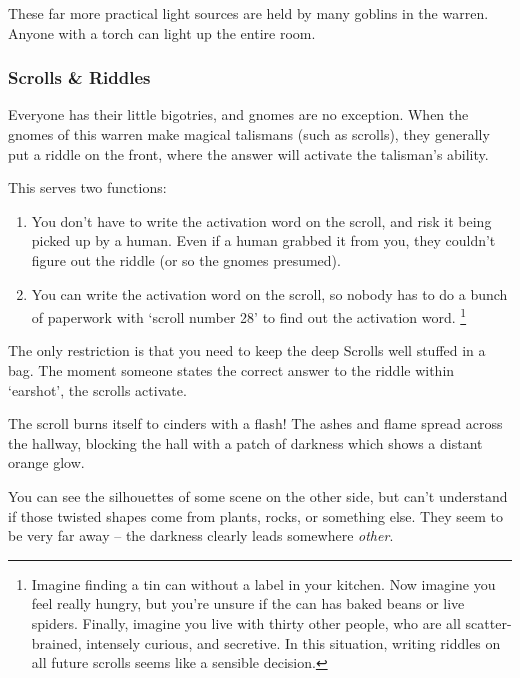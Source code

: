 \begin{multicols}{2}
These far more practical light sources are held by many goblins in the \gls{warren}.
Anyone with a torch can light up the entire room.

\subsubsection{Scrolls \& Riddles}
\label{scrollRiddles}

Everyone has their little bigotries, and gnomes are no exception.
When the gnomes of this \gls{warren} make magical \glspl{talisman} (such as scrolls), they generally put a riddle on the front, where the answer will activate the \gls{talisman}'s ability.

This serves two functions:

\begin{enumerate}
  \item
  You don't have to write the activation word on the scroll, and risk it being picked up by a human.
  Even if a human grabbed it from you, they couldn't figure out the riddle (or so the gnomes presumed).
  \item
  You can write the activation word on the scroll, so nobody has to do a bunch of paperwork with `scroll number 28' to find out the activation word.%
  \footnote{Imagine finding a tin can without a label in your kitchen.
  Now imagine you feel really hungry, but you're unsure if the can has baked beans or live spiders.
  Finally, imagine you live with thirty other people, who are all scatter-brained, intensely curious, and secretive.
  In this situation, writing riddles on all future scrolls seems like a sensible decision.}
\end{enumerate}

The only restriction is that you need to keep the \Gls{deep} Scrolls well stuffed in a bag.
The moment someone states the correct answer to the riddle within `earshot', the scrolls activate.

\labyrinthScroll

\showTalisman

\begin{boxtext}
  The scroll burns itself to cinders with a flash!
  The ashes and flame spread across the hallway, blocking the hall with a patch of darkness which shows a distant orange glow.

  You can see the silhouettes of some scene on the other side, but can't understand if those twisted shapes come from plants, rocks, or something else.
  They seem to be very far away -- the darkness clearly leads somewhere \emph{other}.
\end{boxtext}


\end{multicols}
